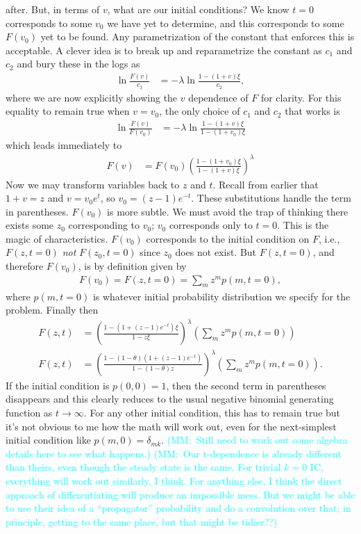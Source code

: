 \documentclass[12pt]{article}%
\newcommand{\mmnote}[1]{\textcolor{cyan}{(MM:~#1)}}
\begin{document}
after. But, in terms of $v$, what are our initial conditions? We know
$t=0$ corresponds to some $v_0$ we have yet to determine, and this
corresponds to some $F(v_0)$ yet to be found. Any parametrization of the
constant that enforces this is acceptable. A clever idea is to break up
and reparametrize the constant as $c_1$ and $c_2$ and bury these in the
logs as
\begin{align}
\ln \frac{F(v)}{c_1} &= -\lambda \ln\frac{1-(1+v)\xi}{c_2},
\end{align}
where we are now explicitly showing the $v$ dependence of $F$ for clarity.
For this equality to remain true when $v=v_0$,
the only choice of $c_1$ and $c_2$ that works is
\begin{align}
\ln \frac{F(v)}{F(v_0)} &= -\lambda \ln\frac{1-(1+v)\xi}{1-(1+v_0)\xi}
\end{align}
which leads immediately to
\begin{align}
F(v) &= F(v_0) \left(\frac{1-(1+v_0)\xi}{1-(1+v)\xi}\right)^{\lambda}
\end{align}
Now we may transform variables back to $z$ and $t$.
Recall from earlier that $1+v=z$ and $v=v_0 e^t$, so $v_0 = (z-1)e^{-t}$.
These substitutions handle the term in parentheses. $F(v_0)$ is more subtle.
We must avoid the trap of thinking there exists some $z_0$ corresponding to $v_0$;
$v_0$ corresponds only to $t=0$. This is the magic of characteristics.
$F(v_0)$ corresponds to the initial condition on $F$, i.e., $F(z,t=0)$
\textit{not} $F(z_0,t=0)$ since $z_0$ does not exist.
But $F(z,t=0)$, and therefore $F(v_0)$, is by definition given by
\begin{align}
F(v_0) = F(z,t=0) = \sum_m z^m p(m, t=0),
\end{align}
where $p(m, t=0)$ is whatever initial probability distribution
we specify for the problem. Finally then
\begin{align}
F(z, t) &=  \left(\frac{1-(1+(z-1)e^{-t})\xi}{1-z\xi}\right)^{\lambda}
                \left(\sum_m z^m p(m, t=0)\right)
\\
F(z, t) &=  \left(\frac{1-(1-\theta)(1+(z-1)e^{-t})}
                        {1-(1-\theta)z}\right)^{\lambda}
                \left(\sum_m z^m p(m, t=0)\right).
\end{align}
If the initial condition is $p(0,0)=1$, then the second term in
parentheses disappears and this clearly reduces to the usual negative
binomial generating function as $t\rightarrow\infty$. For any other
initial condition, this has to remain true but it's not obvious to me
how the math will work out, even for the next-simplest initial condition
like $p(m,0) = \delta_{mk}$.
\mmnote{Still need to work out some algebra details here to see what happens.}
\mmnote{Our t-dependence is already different than theirs, even though
the steady state is the same. For trivial $k=0$ IC, everything will work
out similarly, I think. For anything else, I think the direct approach
of differentiating will produce an impossible mess. But we might be able
to use their idea of a ``propagator'' probability and do a convolution
over that; in principle, getting to the same place, but that might be
tidier??}
\end{document}
